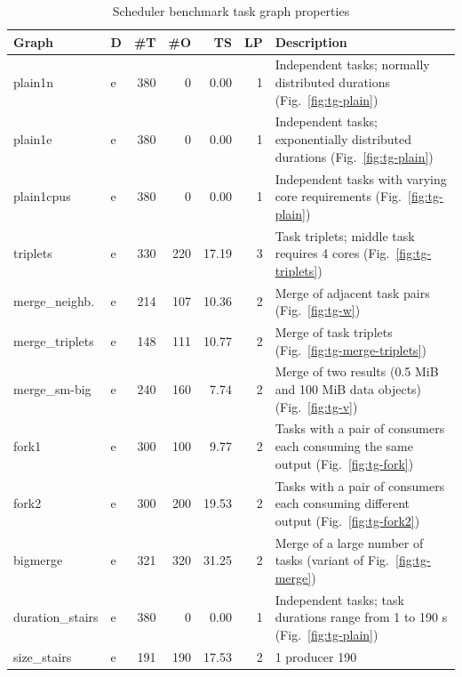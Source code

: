 \begin{table}
	\caption{Scheduler benchmark task graph properties}
	\centering
	\label{tab:estee-graph-properties}
	\begin{tabular}{l|lrrrr|T}
		\toprule
		Graph            & D & \#T & \#O   & TS     & LP  & \normalsize{Description}     \\
		\midrule
		plain1n          & e & 380 & 0     & 0.00   & 1   & Independent tasks;
		normally distributed durations (Fig.~\ref{fig:tg-plain})                         \\
		plain1e          & e & 380 & 0     & 0.00   & 1   & Independent tasks;
		exponentially distributed durations (Fig.~\ref{fig:tg-plain})                    \\
		plain1cpus       & e & 380 & 0     & 0.00   & 1   & Independent tasks with
		varying core requirements (Fig.~\ref{fig:tg-plain})                              \\
		triplets         & e & 330 & 220   & 17.19  & 3   & Task triplets; middle
		task requires 4 cores (Fig.~\ref{fig:tg-triplets})                               \\
		merge\_neighb.   & e & 214 & 107   & 10.36  & 2   & Merge of adjacent
		task pairs (Fig.~\ref{fig:tg-w})                                                 \\
		merge\_triplets  & e & 148 & 111   & 10.77  & 2   & Merge of task
		triplets (Fig.~\ref{fig:tg-merge-triplets})                                      \\
		merge\_sm-big    & e & 240 & 160   & 7.74   & 2   & Merge of two
		results (0.5 MiB and 100 MiB data objects) (Fig.~\ref{fig:tg-v})                 \\
		fork1            & e & 300 & 100   & 9.77   & 2   & Tasks with a pair of
		consumers each consuming the same output (Fig.~\ref{fig:tg-fork})                \\
		fork2            & e & 300 & 200   & 19.53  & 2   & Tasks with a pair of
		consumers each consuming different output (Fig.~\ref{fig:tg-fork2})              \\
		bigmerge         & e & 321 & 320   & 31.25  & 2   & Merge of a large
		number of tasks (variant of Fig.~\ref{fig:tg-merge})                             \\
		duration\_stairs & e & 380 & 0     & 0.00   & 1   & Independent
		tasks; task durations range from 1 to 190 s (Fig.~\ref{fig:tg-plain})            \\
		size\_stairs     & e & 191 & 190   & 17.53  & 2   & 1 producer 190

\end{tabular}
\end{table}
